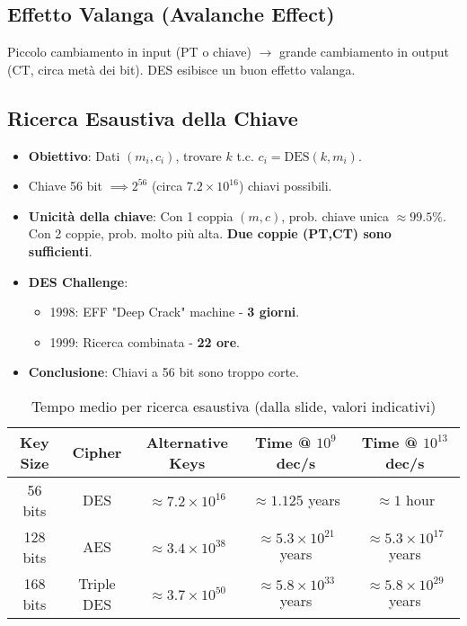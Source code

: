 \subsection{Effetto Valanga (Avalanche Effect)}
Piccolo cambiamento in input (PT o chiave) $\rightarrow$ grande cambiamento in output (CT, circa metà dei bit). DES esibisce un buon effetto valanga.

\subsection{Ricerca Esaustiva della Chiave}
\begin{itemize}
    \item \textbf{Obiettivo}: Dati $(m_i, c_i)$, trovare $k$ t.c. $c_i = \text{DES}(k, m_i)$.
    \item Chiave 56 bit $\implies 2^{56}$ (circa $7.2 \times 10^{16}$) chiavi possibili.
    \item \textbf{Unicità della chiave}: Con 1 coppia $(m,c)$, prob. chiave unica $\approx 99.5\%$. Con 2 coppie, prob. molto più alta. \textbf{Due coppie (PT,CT) sono sufficienti}.
    \item \textbf{DES Challenge}:
    \begin{itemize}
        \item 1998: EFF "Deep Crack" machine - \textbf{3 giorni}.
        \item 1999: Ricerca combinata - \textbf{22 ore}.
    \end{itemize}
    \item \textbf{Conclusione}: Chiavi a 56 bit sono troppo corte.
\end{itemize}

\begin{table}[H]
\centering
\caption{Tempo medio per ricerca esaustiva (dalla slide, valori indicativi)}
\begin{tabular}{|c|c|c|c|c|}
\hline
\textbf{Key Size} & \textbf{Cipher} & \textbf{Alternative Keys} & \textbf{Time @ $10^9$ dec/s} & \textbf{Time @ $10^{13}$ dec/s} \\ \hline
56 bits  & DES        & $\approx 7.2 \times 10^{16}$ & $\approx 1.125$ years & $\approx 1$ hour \\
128 bits & AES        & $\approx 3.4 \times 10^{38}$ & $\approx 5.3 \times 10^{21}$ years & $\approx 5.3 \times 10^{17}$ years \\
168 bits & Triple DES & $\approx 3.7 \times 10^{50}$ & $\approx 5.8 \times 10^{33}$ years & $\approx 5.8 \times 10^{29}$ years \\
\hline
\end{tabular}
\end{table}


